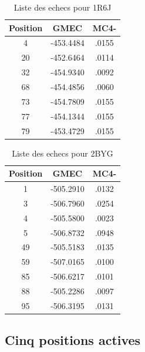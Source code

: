 \documentclass[a4paper,12pt]{article}
\begin{document}
    \begin{table}[!htbp]
      \centering

      \begin{tabular}{|c|c|c|}


        \hline
        Position & GMEC & MC4- \\
        \hline
         4 & -453.4484 & .0155  \\
        20 & -452.6464 & .0114 \\
        32 & -454.9340 & .0092 \\
        68 & -454.4856 & .0060 \\
        73 & -454.7809 & .0155 \\
        77 & -454.1344 & .0155 \\
        79 & -453.4729 & .0155 \\
        
        \hline


      \end{tabular}      
      \caption{Liste des echecs pour 1R6J }
      \label{tab_echec1R6J__1}      
    \end{table}


    \begin{table}[!htbp]
      \centering

      \begin{tabular}{|c|c|c|}

        \hline
        Position & GMEC & MC4- \\
        \hline
        1 & -505.2910 & .0132 \\
        3 & -506.7960 & .0254 \\
        4 & -505.5800 & .0023 \\
        5 & -506.8732 & .0948 \\
        49 & -505.5183 & .0135 \\
        59 & -507.0165 & .0100 \\
        85 & -506.6217 & .0101 \\
        88 & -505.2286 & .0097 \\
        95 & -506.3195 & .0131 \\

        \hline


      \end{tabular}      
      \caption{Liste des echecs pour 2BYG }
      \label{tab_echec2BYG__1}      
    \end{table}


   \subsection{ Cinq positions actives}
\end{document}
